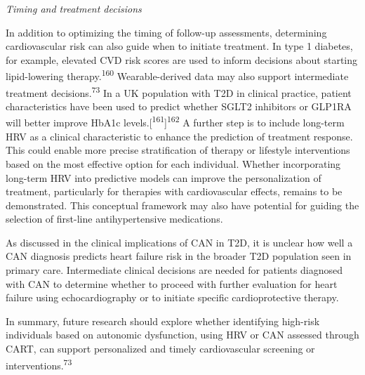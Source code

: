 \documentclass[
  letterpaper,
  headsepline=true,
  open=any]{scrbook}
\begin{document}
\emph{Timing and treatment decisions}

In addition to optimizing the timing of follow-up assessments,
determining cardiovascular risk can also guide when to initiate
treatment. In type 1 diabetes, for example, elevated CVD risk scores are
used to inform decisions about starting lipid-lowering
therapy.\textsuperscript{160} Wearable-derived data may also support
intermediate treatment decisions.\textsuperscript{73} In a UK population
with T2D in clinical practice, patient characteristics have been used to
predict whether SGLT2 inhibitors or GLP1RA will better improve HbA1c
levels.{[}\textsuperscript{161}{]}\textsuperscript{162} A further step
is to include long-term HRV as a clinical characteristic to enhance the
prediction of treatment response. This could enable more precise
stratification of therapy or lifestyle interventions based on the most
effective option for each individual. Whether incorporating long-term
HRV into predictive models can improve the personalization of treatment,
particularly for therapies with cardiovascular effects, remains to be
demonstrated. This conceptual framework may also have potential for
guiding the selection of first-line antihypertensive medications.

As discussed in the clinical implications of CAN in T2D, it is unclear
how well a CAN diagnosis predicts heart failure risk in the broader T2D
population seen in primary care. Intermediate clinical decisions are
needed for patients diagnosed with CAN to determine whether to proceed
with further evaluation for heart failure using echocardiography or to
initiate specific cardioprotective therapy.

In summary, future research should explore whether identifying high-risk
individuals based on autonomic dysfunction, using HRV or CAN assessed
through CART, can support personalized and timely cardiovascular
screening or interventions.\textsuperscript{73}
\end{document}
